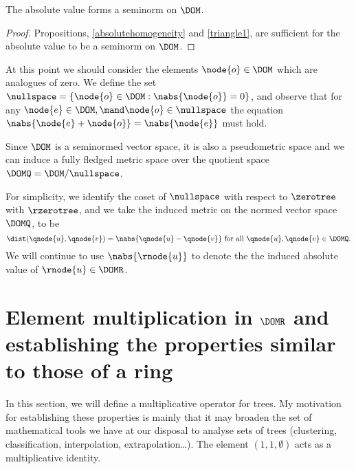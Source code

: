\begin{corollary}\label{gseminorm}
  The absolute value forms a seminorm on $\DOM$.
  \begin{proof}  
    Propositions, \ref{absolutehomogeneity} and \ref{triangle1}, are 
    sufficient for the absolute value to be a seminorm on
    $\DOM$.
  \end{proof}
\end{corollary}

At this point we should consider the elements
$\node{o} \in \DOM$
which are analogues of zero. We define the set
$\nullspace =\{\node{o}\in\DOM: \nabs{\node{o}} = 0\}$,
and observe that for any
$\node{e} \in \DOM, \mand \node{o} \in \nullspace$
the equation
$\nabs{\node{e} + \node{o}} = \nabs{\node{e}}$
must hold. 

Since $\DOM$ is a seminormed vector space, it is also a pseudometric
space and we can induce a fully fledged metric space over the quotient
space $\DOMQ = \DOM / \nullspace$.

For simplicity, we identify the coset of $\nullspace$ with respect to
$\zerotree$ with $\rzerotree$, and we take the induced metric on the
normed vector space $\DOMQ$, to be
\[\dist(\qnode{u},\qnode{v}) =
\nabs{\qnode{u} - \qnode{v}} \text{ for all }\qnode{u}, \qnode{v} \in
\DOMQ.\]  We will continue to use \(\nabs{\rnode{u}}\) to denote the
the induced absolute value of \(\rnode{u}\in\DOMR\).




\section{Element multiplication in $\DOMR$ and establishing the
  properties similar to those of a ring}

In this section, we will define a multiplicative operator for
trees. My motivation for establishing these properties is mainly that
it may broaden the set of mathematical tools we have at our
disposal to analyse sets of trees (clustering, classification,
interpolation, extrapolation\ldots).  The element \((1,1,\emptyset)\)
acts as a multiplicative identity.


